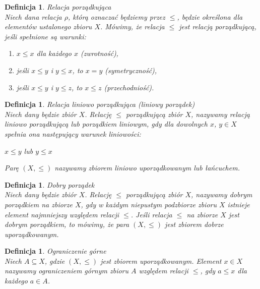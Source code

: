 \documentclass[12pt,a4paper]{report}
\newtheorem{definition}[theorem]{Definicja}
\begin{document}
\begin{definition}{Relacja porządkująca \cite[Rozdział 1]{kuratowski2004}\\}
Niech dana relacja $\rho$, którą oznaczać będziemy przez $\leq$, będzie określona dla elementów ustalonego zbioru $X$. Mówimy, że relacja $\leq$ jest relacją porządkującą, jeśli spełnione są warunki:
\begin{enumerate}
\item $x \leq x$ dla każdego $x$ (zwrotność),
\item jeśli $x \leq y$ i $y \leq x$, to $x=y$ (symetryczność),
\item jeśli $x \leq y$ i $y \leq z$, to $x \leq z$ (przechodniość).\\
\end{enumerate}
\end{definition}

\begin{definition}{Relacja liniowo porządkująca (liniowy porządek) \cite[Rozdział 2]{blaszczyk2007}\\}
Niech dany będzie zbiór $X$. Relację $\leq$ porządkującą zbiór $X$, nazywamy relacją liniowo porządkującą lub porządkiem liniowym, gdy dla dowolnych $x$, $y \in X$ spełnia ona następujący warunek liniowości:
\begin{center}
$x \leq y$ lub $y \leq x$
\end{center}
Parę $(X, \leq)$ nazywamy zbiorem liniowo uporządkowanym lub łańcuchem.\\
\end{definition}

\begin{definition}{Dobry porządek \cite[Rozdział 2]{blaszczyk2007}\\}
Niech dany będzie zbiór $X$. Relację $\leq$ porządkującą zbiór $X$, nazywamy dobrym porządkiem na zbiorze $X$, gdy w każdym niepustym podzbiorze zbioru $X$ istnieje element najmniejszy względem relacji $\leq$. Jeśli relacja $\leq$ na zbiorze $X$ jest dobrym porządkiem, to mówimy, że para $(X,\leq)$ jest zbiorem dobrze uporządkowanym.\\
\end{definition}

\begin{definition}{Ograniczenie górne \cite[Rozdział 2]{blaszczyk2007}\\}
Niech $A \subseteq X$, gdzie $(X, \leq)$ jest zbiorem uporządkowanym. Element $x \in X$ nazywamy ograniczeniem górnym zbioru $A$ względem relacji $\leq$, gdy $a \leq x$ dla każdego $a \in A$. \\
\end{definition}
\end{document}
